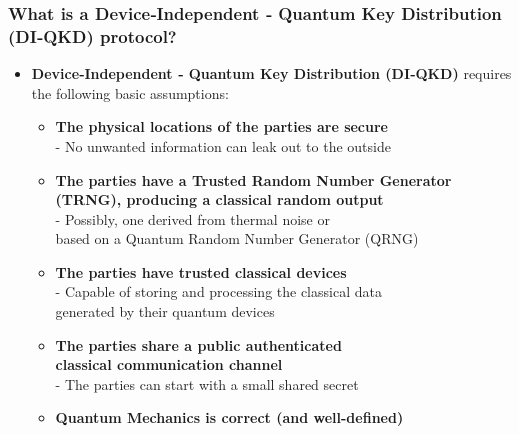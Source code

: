 \documentclass{beamer}
\begin{document}
    \begin{frame}
        \frametitle{\footnotesize What is a Device‑Independent ‑ Quantum Key Distribution (DI‑QKD) protocol?}

        \vspace{2.5ex}
        \begin{itemize}
            \item \textbf{Device‑Independent ‑ Quantum Key Distribution (DI‑QKD)} requires the following basic assumptions:
            \begin{itemize}
                \normalsize
                \item \textbf{The physical locations of the parties are secure}\\
                \small
                - No unwanted information can leak out to the outside
                \normalsize
                \item \textbf{The parties have a Trusted Random Number Generator (TRNG), producing a classical random output}\\
                \small
                - Possibly, one derived from thermal noise or \\\hspace{0.5em}based on a Quantum Random Number Generator (QRNG)
                \normalsize
                \item \textbf{The parties have trusted classical devices}\\
                \small
                - Capable of storing and processing the classical data\\\hspace{0.5em}generated by their quantum devices
                \normalsize
                \item \textbf{The parties share a public authenticated\\ classical communication channel}\\
                \small
                - The parties can start with a small shared secret
                \normalsize
                \item \textbf{Quantum Mechanics is correct (and well-defined)}
            \end{itemize}
        \end{itemize}
    \end{frame}
\end{document}
